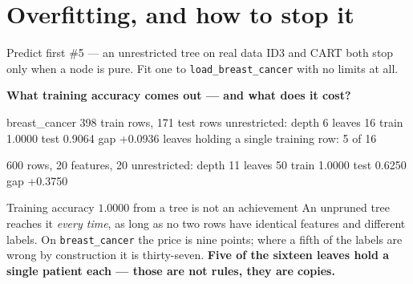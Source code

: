 \documentclass[aspectratio=169]{beamer}
\begin{document}
\section[Pruning]{Overfitting, and how to stop it}
\label{sec:prune}

\begin{frame}[fragile,shrink=8]{Predict first \#5 --- an unrestricted tree on real data}
ID3 and CART both stop only when a node is pure. Fit one to
\texttt{load\_breast\_cancer} with no limits at all.
\begin{center}
  \textbf{What training accuracy comes out --- and what does it cost?}
\end{center}
\vspace{0.2em}
\begin{outblk}
   breast_cancer  398 train rows, 171 test rows
   unrestricted: depth 6  leaves 16  train 1.0000  test 0.9064  gap +0.0936
   leaves holding a single training row: 5 of 16
\end{outblk}
\begin{outblk}
   600 rows, 20 features, 20%
   unrestricted: depth 11  leaves 50  train 1.0000  test 0.6250  gap +0.3750
\end{outblk}
\begin{alertblock}{Training accuracy $1.0000$ from a tree is not an achievement}
  \footnotesize An unpruned tree reaches it \emph{every time}, as long as no
  two rows have identical features and different labels. On
  \texttt{breast\_cancer} the price is nine points; where a fifth of the
  labels are wrong by construction it is thirty-seven. \textbf{Five of the
  sixteen leaves hold a single patient each --- those are not rules, they are
  copies.}
\end{alertblock}
\end{frame}
\end{document}
